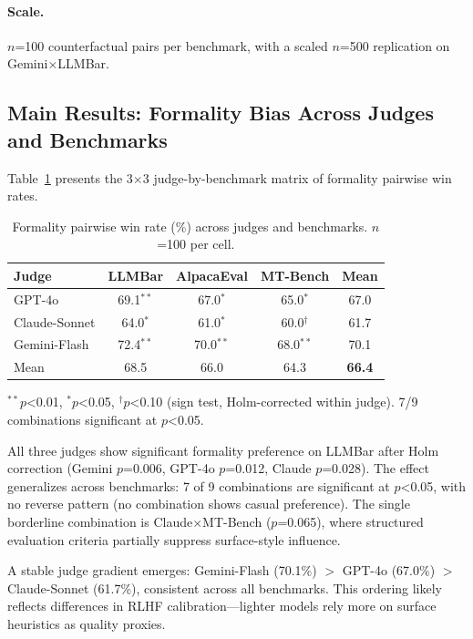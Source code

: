 \documentclass[11pt,a4paper]{article}
\begin{document}
\paragraph{Scale.} $n$=100 counterfactual pairs per benchmark, with a scaled $n$=500 replication on Gemini$\times$LLMBar.

\subsection{Main Results: Formality Bias Across Judges and Benchmarks}

Table~\ref{tab:main_matrix} presents the 3$\times$3 judge-by-benchmark matrix of formality pairwise win rates.

\begin{table}[t]
\centering
\small
\caption{Formality pairwise win rate (\%) across judges and benchmarks. $n$=100 per cell.}
\label{tab:main_matrix}
\begin{tabular}{lcccc}
\toprule
\textbf{Judge} & \textbf{LLMBar} & \textbf{AlpacaEval} & \textbf{MT-Bench} & \textbf{Mean} \\
\midrule
GPT-4o         & 69.1$^{**}$ & 67.0$^{*}$ & 65.0$^{*}$  & 67.0 \\
Claude-Sonnet  & 64.0$^{*}$  & 61.0$^{*}$ & 60.0$^{\dagger}$ & 61.7 \\
Gemini-Flash   & 72.4$^{**}$ & 70.0$^{**}$& 68.0$^{**}$ & 70.1 \\
\midrule
Mean           & 68.5        & 66.0       & 64.3        & \textbf{66.4} \\
\bottomrule
\end{tabular}
\begin{flushleft}
\footnotesize $^{**}p$<0.01, $^{*}p$<0.05, $^{\dagger}p$<0.10 (sign test, Holm-corrected within judge). 7/9 combinations significant at $p$<0.05.
\end{flushleft}
\end{table}

All three judges show significant formality preference on LLMBar after Holm correction (Gemini $p$=0.006, GPT-4o $p$=0.012, Claude $p$=0.028).
The effect generalizes across benchmarks: 7 of 9 combinations are significant at $p$<0.05, with no reverse pattern (no combination shows casual preference).
The single borderline combination is Claude$\times$MT-Bench ($p$=0.065), where structured evaluation criteria partially suppress surface-style influence.

A stable judge gradient emerges: Gemini-Flash (70.1\%) $>$ GPT-4o (67.0\%) $>$ Claude-Sonnet (61.7\%), consistent across all benchmarks.
This ordering likely reflects differences in RLHF calibration---lighter models rely more on surface heuristics as quality proxies.
\end{document}

